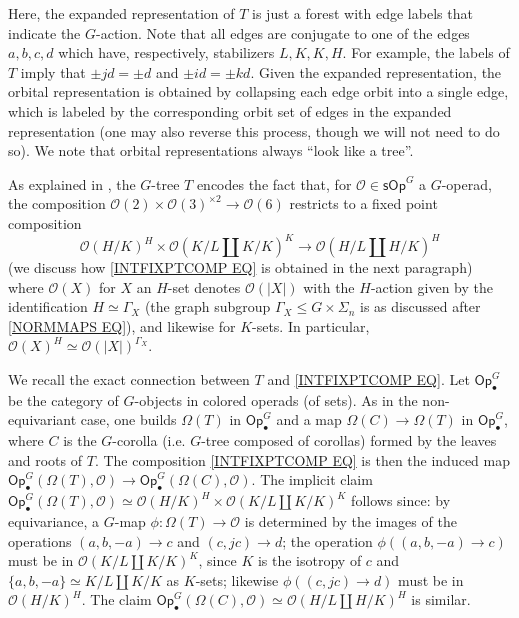 \documentclass[a4paper,10pt
,draft
]{article}%
\numberwithin{equation}{section}
\numberwithin{figure}{section}
\theoremstyle{definition} %
\renewcommand{\O}{\ensuremath{\mathcal O}}
\newcommand{\1}{\ensuremath{\mathbbm 1}}%
\begin{document}
Here, the expanded representation of $T$ is just
a forest with edge labels that indicate the $G$-action.
Note that all edges are conjugate to one of the 
edges $a,b,c,d$ which have, respectively, stabilizers $L, K, K, H$.
For example, the labels of $T$ imply that 
$\pm j d = \pm d$ and $\pm i d = \pm k d$.
Given the expanded representation,
the orbital representation is  
obtained by collapsing each edge orbit into a single edge,
which is labeled by the corresponding orbit set of edges in the expanded representation
(one may also reverse this process, though we will not need to do so).
We note that orbital representations always ``look like a tree''.


As explained in \cite[Example 4.9]{Pe17},
the $G$-tree $T$ encodes the fact that,
for $\O \in \mathsf{sOp}^G$ a $G$-operad,
the composition 
$\mathcal{O}(2) \times \mathcal{O}(3)^{\times 2} \to 
\mathcal{O}(6)$ restricts to a fixed point composition
\begin{equation}\label{INTFIXPTCOMP EQ}
\O(H/K)^{H} \times \O(K/L \amalg K/K)^{K} \to
\O(H/L \amalg H/K)^{H}
\end{equation}
(we discuss how \eqref{INTFIXPTCOMP EQ}
is obtained in the next paragraph)
where $\O(X)$ for $X$ an $H$-set denotes $\O(|X|)$
\index{OX@$\O(X)$, $X \in \mathsf F^H$}
with the $H$-action
given by the identification $H \simeq \Gamma_X$
(the graph subgroup $\Gamma_X \leq G \times \Sigma_n$ is as discussed after 
\eqref{NORMMAPS EQ}),
and likewise for $K$-sets.
In particular, $\O(X)^H \simeq \O(|X|)^{\Gamma_X}$.


We recall the exact connection between $T$ and \eqref{INTFIXPTCOMP EQ}. 
Let $\mathsf{Op}_{\bullet}^G$
be the category of 
$G$-objects in colored operads (of sets).
As in the non-equivariant case,
one builds 
$\Omega(T)$ in $\mathsf{Op}_{\bullet}^G$
and a map
$\Omega(C) \to \Omega(T)$
in $\mathsf{Op}_{\bullet}^G$,
where $C$ is the $G$-corolla (i.e. $G$-tree composed of corollas)
formed by the leaves and roots of $T$.
%
The composition
\eqref{INTFIXPTCOMP EQ}
is then the induced map
$\mathsf{Op}_{\bullet}^G
\left(\Omega(T),\mathcal{O}\right)
\to
\mathsf{Op}_{\bullet}^G
\left(\Omega(C),\mathcal{O}\right)$.
%
The implicit claim  
$\mathsf{Op}_{\bullet}^G
\left(\Omega(T),\mathcal{O}\right)
\simeq
\O(H/K)^{H} \times \O(K/L \amalg K/K)^{K}
$
follows since:
by equivariance, a $G$-map
$\phi \colon \Omega(T) \to \O$
is determined by the images of the operations
$(a,b,-a) \to c$ and
$(c,jc) \to d$;
the operation 
$\phi\left((a,b,-a) \to c\right)$
must be in $\O(K/L \amalg K/K)^{K}$,
since $K$ is the isotropy of $c$ and
$\{a,b,-a\} \simeq K/L \amalg K/K$
as $K$-sets; 
likewise $\phi\left((c,jc) \to d\right)$
must be in $\O(H/K)^{H}$.
The claim 
$\mathsf{Op}_{\bullet}^G
\left(\Omega(C),\mathcal{O}\right)
\simeq 
\O(H/L \amalg H/K)^{H}$
is similar.
\end{document}
